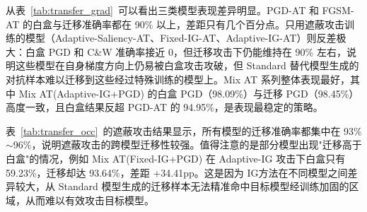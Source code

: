 \begin{table}[htbp]
  \centering
  \caption{代表性防御策略在遮蔽类攻击下的白盒 vs 迁移准确率对比（\%，替代模型：Standard）}
  \label{tab:transfer_occ}
\end{table}



从表~\ref{tab:transfer_grad}~可以看出三类模型表现差异明显。PGD-AT 和 FGSM-AT 的白盒与迁移准确率都在 90\% 以上，差距只有几个百分点。只用遮蔽攻击训练的模型（Adaptive-Saliency-AT、Fixed-IG-AT、Adaptive-IG-AT）则反差极大：白盒 PGD 和 C\&W 准确率接近 0，但迁移攻击下仍能维持在 90\% 左右，说明这些模型在自身梯度方向上仍易被白盒攻击攻破，但 Standard 替代模型生成的对抗样本难以迁移到这些经过特殊训练的模型上。Mix AT 系列整体表现最好，其中 Mix AT(Adaptive-IG+PGD) 的白盒 PGD（98.09\%）与迁移 PGD（98.45\%）高度一致，且白盒结果反超 PGD-AT 的 94.95\%，是表现最稳定的策略。

表~\ref{tab:transfer_occ}~的遮蔽攻击结果显示，所有模型的迁移准确率都集中在 93\%$\sim$96\%，说明遮蔽攻击的跨模型迁移性较强。值得注意的是部分模型出现"迁移高于白盒"的情况，例如 Mix AT(Fixed-IG+PGD) 在 Adaptive-IG 攻击下白盒只有 59.23\%，迁移却达 93.64\%，差距 +34.41pp。这是因为 IG方法在不同模型之间差异较大，从 Standard 模型生成的迁移样本无法精准命中目标模型经训练加固的区域，从而难以有效攻击目标模型。

